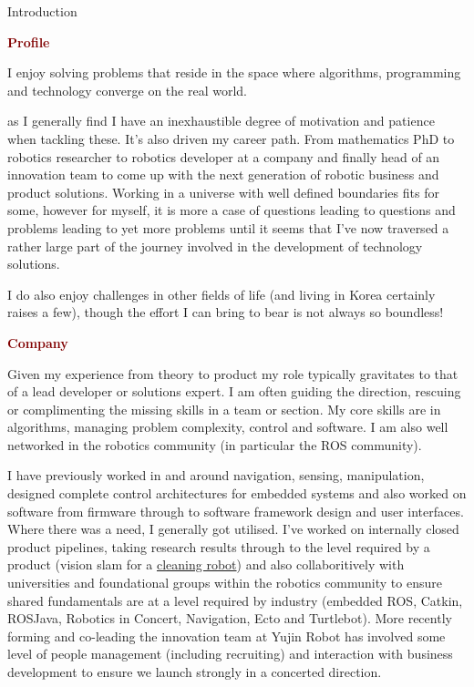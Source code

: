\documentclass[a4paper,10pt]{article}
\begin{document}
\begin{cvsection}{Introduction}
  \vspace{-1.2em}

  \textcolor{maroon}{\textbf{Profile}}

  I enjoy solving problems that reside in the space where algorithms, programming and technology converge on the real world. 
  
  as I generally find I have an inexhaustible degree of motivation and patience when tackling these. It's also driven my career path. From mathematics PhD to robotics researcher to robotics developer at a company and finally head of an innovation team to come up with the next generation of robotic business and product solutions. Working in a universe with well defined boundaries fits for some, however for myself, it is more a case of questions leading to questions and problems leading to yet more problems until it seems that I've now traversed a rather large part of the journey involved in the development of technology solutions.
  
  I do also enjoy challenges in other fields of life (and living in Korea certainly raises a few), though the effort I can bring to bear is not always so boundless!
  
  \textcolor{maroon}{\textbf{Company}}

  Given my experience from theory to product my role typically gravitates to that of a lead developer or solutions expert. I am often guiding the direction, rescuing or complimenting the missing skills in a team or section. My core skills are in algorithms, managing problem complexity, control and software. I am also well networked in the robotics community (in particular the ROS community).
  
  I have previously worked in and around navigation, sensing, manipulation, designed complete control architectures for embedded systems and also worked on software from firmware through to software framework design and user interfaces. Where there was a need, I generally got utilised. I've worked on internally closed product pipelines, taking research results through to the level required by a product (vision slam for a \href{http://www.p4c.philips.com/cgi-bin/cpindex.pl?ctn=FC9910/01&dct=QAD&faqview=1&mid=Link_FAQs&refnr=0079825&scy=FR&slg=AEN&view=aa12_view_partial.html}{cleaning robot}) and also collaboritively with universities and foundational groups within the robotics community to ensure shared fundamentals are at a level required by industry (embedded ROS, Catkin, ROSJava, Robotics in Concert, Navigation, Ecto and Turtlebot). More recently forming and co-leading the innovation team at Yujin Robot has involved some level of people management (including recruiting) and interaction with business development to ensure we launch strongly in a concerted direction.
  

\end{cvsection}
\end{document}
